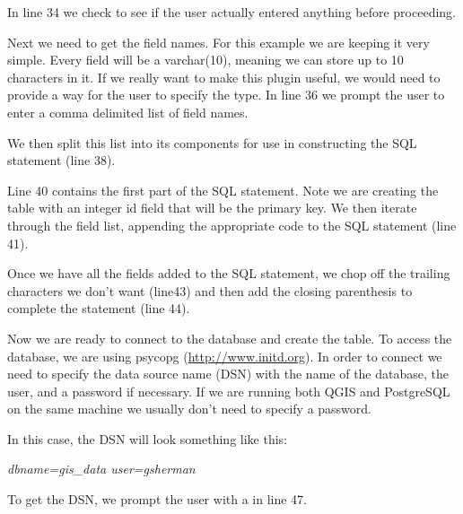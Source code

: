 In line 34 we check to see if the user actually entered anything before proceeding.

Next we need to get the field names.
For this example we are keeping it very simple.
Every field will be a varchar(10), meaning we can store up to 10 characters in it.
If we really want to make this plugin useful, we would need to provide a way for the user to specify the type.
In line 36 we prompt the user to enter a comma delimited list of field names.


We then split this list into its components for use in constructing the SQL statement (line 38).

Line 40 contains the first part of the SQL statement.
Note we are creating the table with an integer id field that will be the primary key.
We then iterate through the field list, appending the appropriate code to the SQL statement (line 41).

Once we have all the fields added to the SQL statement, we chop off the trailing characters we don't want (line43) and then add the closing parenthesis to complete the statement (line 44).

Now we are ready to connect to the database and create the table.
To access the database, we are using psycopg (\url{http://www.initd.org}).
In order to connect we need to specify the data source name (DSN) with the name of the database, the user, and a password if necessary.
If we are running both QGIS and PostgreSQL on the same machine we usually don't need to specify a password.

In this case, the DSN will look something like this:

\begin{center}
  \textsl{dbname=gis\_data user=gsherman}
\end{center}

To get the DSN, we prompt the user with a  in line 47.


